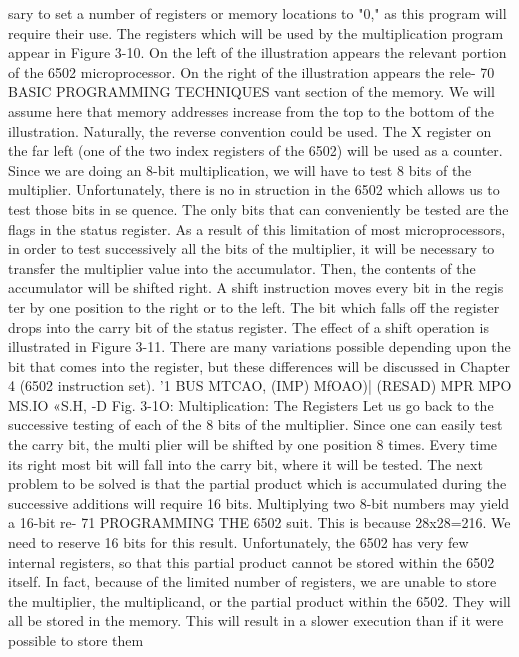 \documentclass{book}
\begin{document}
sary to set a number of registers or memory locations to "0," as
this program will require their use. The registers which will be
used by the multiplication program appear in Figure 3-10. On the
left of the illustration appears the relevant portion of the 6502
microprocessor. On the right of the illustration appears the rele-
70
BASIC PROGRAMMING TECHNIQUES
vant section of the memory. We will assume here that memory
addresses increase from the top to the bottom of the illustration.
Naturally, the reverse convention could be used. The X register on
the far left (one of the two index registers of the 6502) will be used
as a counter. Since we are doing an 8-bit multiplication, we will
have to test 8 bits of the multiplier. Unfortunately, there is no in
struction in the 6502 which allows us to test those bits in se
quence. The only bits that can conveniently be tested are the
flags in the status register. As a result of this limitation of most
microprocessors, in order to test successively all the bits of the
multiplier, it will be necessary to transfer the multiplier value
into the accumulator. Then, the contents of the accumulator will
be shifted right. A shift instruction moves every bit in the regis
ter by one position to the right or to the left. The bit which falls
off the register drops into the carry bit of the status register. The
effect of a shift operation is illustrated in Figure 3-11. There are
many variations possible depending upon the bit that comes into
the register, but these differences will be discussed in Chapter 4
(6502 instruction set).
'1
BUS
MTCAO,
(IMP)
MfOAO)|
(RESAD)
MPR
MPO
MS.IO
«S.H,
-D
Fig. 3-1O: Multiplication: The Registers
Let us go back to the successive testing of each of the 8 bits of
the multiplier. Since one can easily test the carry bit, the multi
plier will be shifted by one position 8 times. Every time its right
most bit will fall into the carry bit, where it will be tested.
The next problem to be solved is that the partial product which
is accumulated during the successive additions will require
16 bits. Multiplying two 8-bit numbers may yield a 16-bit re-
71
PROGRAMMING THE 6502
suit. This is because 28x28=216. We need to reserve 16 bits for this
result. Unfortunately, the 6502 has very few internal registers, so
that this partial product cannot be stored within the 6502 itself.
In fact, because of the limited number of registers, we are unable
to store the multiplier, the multiplicand, or the partial product
within the 6502. They will all be stored in the memory. This will
result in a slower execution than if it were possible to store them
\end{document}
